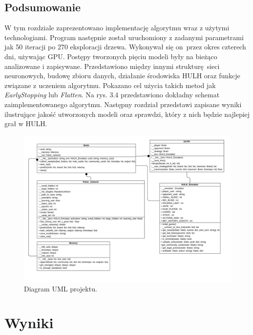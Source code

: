 \documentclass[12pt,oneside,a4paper]{report}
\begin{document}
\newpage

\section{Podsumowanie}


W tym rozdziale zaprezentowano implementację algorytmu wraz z użytymi technologiami. Program
następnie został uruchomiony  z zadanymi parametrami jak 50 iteracji po 270 eksploracji drzewa.
Wykonywał się on przez okres czterech dni, używając GPU. Postępy
tworzonych pięciu modeli były na bieżąco analizowane i zapisywane. Przedstawiono 
między innymi strukturę sieci
neuronowych, budowę zbioru danych, działanie środowiska HULH oraz funkcje związane z uczeniem
algorytmu. Pokazano cel użycia takich metod jak \emph{EarlyStopping} lub \emph{Flatten}. Na rys. 3.4
przedstawiono dokładny schemat zaimplementowanego algorytmu.
Następny
rozdział przedstawi zapisane wyniki ilustrujące jakość utworzonych modeli oraz sprawdzi, który z
nich będzie najlepiej grał w HULH.

\vspace{1cm}

\begin{figure}[!ht]
  \centering
  \hspace*{-1cm}   
  \includegraphics[width=1.1\textwidth]{./img/uml.pdf}
  \caption{Diagram UML projektu.}
\end{figure}





\chapter{Wyniki}
\end{document}
